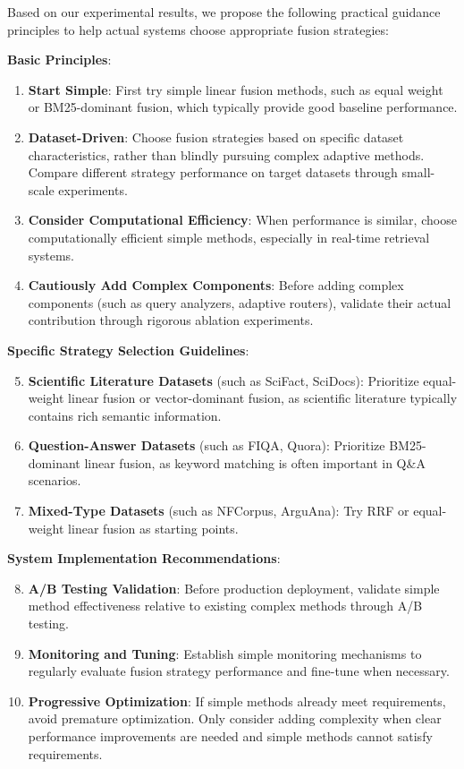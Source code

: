 \documentclass[letterpaper]{article} %
\begin{document}
Based on our experimental results, we propose the following practical guidance principles to help actual systems choose appropriate fusion strategies:

\textbf{Basic Principles}:
\begin{enumerate}
\item \textbf{Start Simple}: First try simple linear fusion methods, such as equal weight or BM25-dominant fusion, which typically provide good baseline performance.

\item \textbf{Dataset-Driven}: Choose fusion strategies based on specific dataset characteristics, rather than blindly pursuing complex adaptive methods. Compare different strategy performance on target datasets through small-scale experiments.

\item \textbf{Consider Computational Efficiency}: When performance is similar, choose computationally efficient simple methods, especially in real-time retrieval systems.

\item \textbf{Cautiously Add Complex Components}: Before adding complex components (such as query analyzers, adaptive routers), validate their actual contribution through rigorous ablation experiments.
\end{enumerate}

\textbf{Specific Strategy Selection Guidelines}:
\begin{enumerate}
\setcounter{enumi}{4}
\item \textbf{Scientific Literature Datasets} (such as SciFact, SciDocs): Prioritize equal-weight linear fusion or vector-dominant fusion, as scientific literature typically contains rich semantic information.

\item \textbf{Question-Answer Datasets} (such as FIQA, Quora): Prioritize BM25-dominant linear fusion, as keyword matching is often important in Q\&A scenarios.

\item \textbf{Mixed-Type Datasets} (such as NFCorpus, ArguAna): Try RRF or equal-weight linear fusion as starting points.
\end{enumerate}

\textbf{System Implementation Recommendations}:
\begin{enumerate}
\setcounter{enumi}{7}
\item \textbf{A/B Testing Validation}: Before production deployment, validate simple method effectiveness relative to existing complex methods through A/B testing.

\item \textbf{Monitoring and Tuning}: Establish simple monitoring mechanisms to regularly evaluate fusion strategy performance and fine-tune when necessary.

\item \textbf{Progressive Optimization}: If simple methods already meet requirements, avoid premature optimization. Only consider adding complexity when clear performance improvements are needed and simple methods cannot satisfy requirements.
\end{enumerate}
\end{document}
